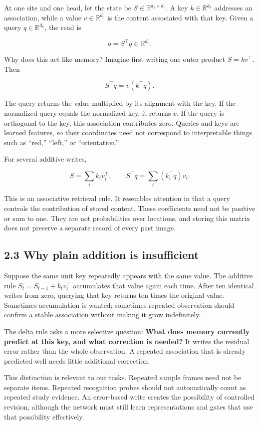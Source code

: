 \documentclass[
  11pt,
]{article}
\let\oldsubsection\subsection
\renewcommand{\subsection}{\Needspace{6\baselineskip}\oldsubsection}
\begin{document}
At one site and one head, let the state be
\(S\in\mathbb R^{d_k\times d_v}\). A key \(k\in\mathbb R^{d_k}\)
addresses an association, while a value \(v\in\mathbb R^{d_v}\) is the
content associated with that key. Given a query \(q\in\mathbb R^{d_k}\),
the read is

\[o=S^\top q\in\mathbb R^{d_v}.\]

Why does this act like memory? Imagine first writing one outer product
\(S=kv^\top\). Then

\[S^\top q=v(k^\top q).\]

The query returns the value multiplied by its alignment with the key. If
the normalized query equals the normalized key, it returns \(v\). If the
query is orthogonal to the key, this association contributes zero.
Queries and keys are learned features, so their coordinates need not
correspond to interpretable things such as ``red,'' ``left,'' or
``orientation.''

For several additive writes,

\[S=\sum_i k_i v_i^\top,\qquad S^\top q=\sum_i(k_i^\top q)v_i.\]

This is an associative retrieval rule. It resembles attention in that a
query controls the contribution of stored content. These coefficients
need not be positive or sum to one. They are not probabilities over
locations, and storing this matrix does not preserve a separate record
of every past image.

\subsection{2.3 Why plain addition is
insufficient}\label{why-plain-addition-is-insufficient}

Suppose the same unit key repeatedly appears with the same value. The
additive rule \(S_t=S_{t-1}+k_tv_t^\top\) accumulates that value again
each time. After ten identical writes from zero, querying that key
returns ten times the original value. Sometimes accumulation is wanted;
sometimes repeated observation should confirm a stable association
without making it grow indefinitely.

The delta rule asks a more selective question: \textbf{What does memory
currently predict at this key, and what correction is needed?} It writes
the residual error rather than the whole observation. A repeated
association that is already predicted well needs little additional
correction.

This distinction is relevant to our tasks. Repeated sample frames need
not be separate items. Repeated recognition probes should not
automatically count as repeated study evidence. An error-based write
creates the possibility of controlled revision, although the network
must still learn representations and gates that use that possibility
effectively.
\end{document}
